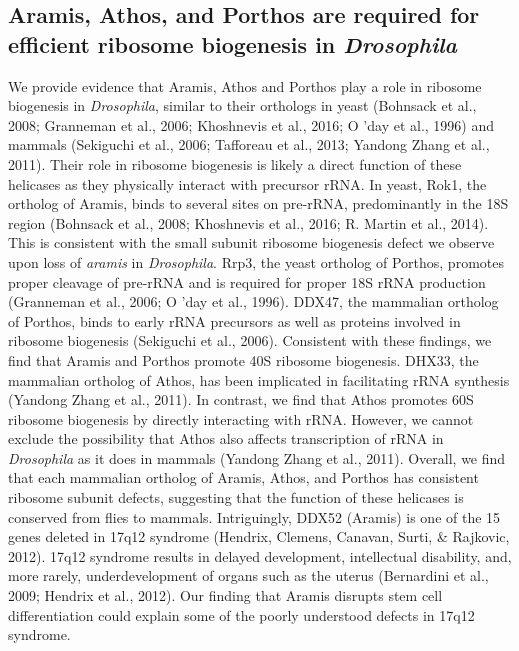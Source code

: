 \documentclass[12pt,oneside]{reedthesis}
\begin{document}
\hypertarget{aramis-athos-and-porthos-are-required-for-efficient-ribosome-biogenesis-in-drosophila}{%
\subsection{\texorpdfstring{Aramis, Athos, and Porthos are required for efficient ribosome biogenesis in \emph{Drosophila}}{Aramis, Athos, and Porthos are required for efficient ribosome biogenesis in Drosophila}}\label{aramis-athos-and-porthos-are-required-for-efficient-ribosome-biogenesis-in-drosophila}}

We provide evidence that Aramis, Athos and Porthos play a role in
ribosome biogenesis in \emph{Drosophila}, similar to their orthologs in yeast
(Bohnsack et al., 2008; Granneman et al., 2006; Khoshnevis et al., 2016; O 'day et al., 1996) and
mammals (Sekiguchi et al., 2006; Tafforeau et al., 2013; Yandong Zhang et al., 2011). Their role in ribosome
biogenesis is likely a direct function of these helicases as they
physically interact with precursor rRNA. In yeast, Rok1, the ortholog of
Aramis, binds to several sites on pre-rRNA, predominantly in the 18S
region (Bohnsack et al., 2008; Khoshnevis et al., 2016; R. Martin et al., 2014). This is consistent with the
small subunit ribosome biogenesis defect we observe upon loss of
\emph{aramis} in \emph{Drosophila}. Rrp3, the yeast ortholog of Porthos, promotes
proper cleavage of pre-rRNA and is required for proper 18S rRNA
production (Granneman et al., 2006; O 'day et al., 1996). DDX47, the
mammalian ortholog of Porthos, binds to early rRNA precursors as well as
proteins involved in ribosome biogenesis
(Sekiguchi et al., 2006). Consistent with these findings,
we find that Aramis and Porthos promote 40S ribosome biogenesis. DHX33,
the mammalian ortholog of Athos, has been implicated in facilitating
rRNA synthesis (Yandong Zhang et al., 2011). In contrast,
we find that Athos promotes 60S ribosome biogenesis by directly
interacting with rRNA. However, we cannot exclude the possibility that
Athos also affects transcription of rRNA in \emph{Drosophila} as it does in
mammals (Yandong Zhang et al., 2011). Overall, we find
that each mammalian ortholog of Aramis, Athos, and Porthos has
consistent ribosome subunit defects, suggesting that the function of
these helicases is conserved from flies to mammals. Intriguingly, DDX52
(Aramis) is one of the 15 genes deleted in 17q12 syndrome
(Hendrix, Clemens, Canavan, Surti, \& Rajkovic, 2012). 17q12 syndrome results in
delayed development, intellectual disability, and, more rarely,
underdevelopment of organs such as the uterus
(Bernardini et al., 2009; Hendrix et al., 2012). Our finding that Aramis
disrupts stem cell differentiation could explain some of the poorly
understood defects in 17q12 syndrome.
\end{document}
